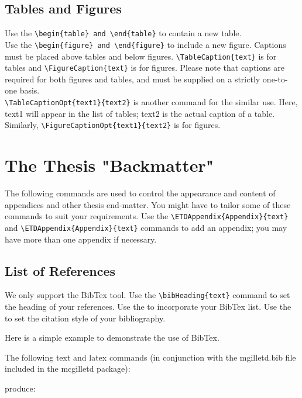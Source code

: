 \documentclass[12pt,Bold,letterpaper,TexShade]{mcgilletdclass}
\numberwithin{equation}{section}
\begin{document}
\section{Tables and Figures}
Use the \verb=\begin{table} and \end{table}= to contain a new table.\\
Use the \verb=\begin{figure} and \end{figure}= to include a new figure.
Captions must be placed above
tables and below figures. \verb=\TableCaption{text}= is for tables and 
\verb=\FigureCaption{text}= is for figures.  Please note that captions
are required for both figures and tables, and must be supplied on a 
strictly one-to-one basis. \\

\verb=\TableCaptionOpt{text1}{text2}= is another command for the similar use.
Here, text1 will appear in the list of tables; text2 is the actual caption of
a table. Similarly, \verb=\FigureCaptionOpt{text1}{text2}= is for figures. \\



\chapter{The Thesis "Backmatter"}
The following commands are used to control the appearance and content
of appendices and other thesis end-matter.
You might have to tailor some of these commands to suit your 
requirements.
Use the \verb=\ETDAppendix{Appendix}{text}=
and \verb=\ETDAppendix{Appendix}{text}=
commands to add an appendix; you may have more than one appendix if 
necessary.

\section{List of References}
We only support the BibTex tool.
Use the \verb=\bibHeading{text}= command to set the heading of your references.
Use the \verb== to incorporate your BibTex list.
Use the \verb== to set the citation style of your
bibliography.

Here is a simple example to demonstrate the use of BibTex.

The following text and latex commands (in conjunction with the mgilletd.bib
file included in the mcgilletd package):


produce:
\end{document}
